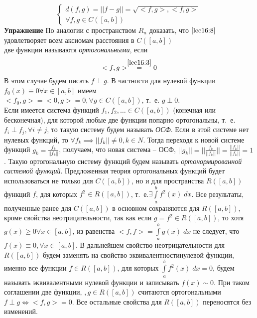 \documentclass[../../main.tex]{subfiles}
\begin{document}
\begin{lemma}
\begin{lemma}
\begin{equation}
\begin{cases}
	 d(f, g) = ||f - g|| = \sqrt{<f, g>, <f, g>}\\
	 \forall f, g \in C(\left[a, b\right])
	 \end{cases}
	 \end{equation}
	\textbf{Упражнение} По аналогии с пространством $R_n$ доказать, что
	 $\eqref{lec16:8}$ удовлетворяет всем аксиомам расстояния в $C(\left[a, 
	 b\right])$\\
	две функции называютя \emph{ортогональными}, если
	\begin{equation} 
	\label{lec16:9}
	<f, g> \stackrel{\eqref{lec16:3}}{=} 0
	\end{equation}
	 В этом случае будем писать $f \perp g$. В частности для нулевой функции 
	 $f_0(x)
	  \equiv 0 \forall x \in \left[a, b\right]$ имеем\\
	 $<f_0, g> = <0, g> = 0, \forall g \in C(\left[a, b\right])$, т.~е. $g\perp 
	 0$.\\
	 Если имеется система функций $f_1, f_2, \ldots \in  C(\left[a, b\right]) $
	  (конечная или бесконечная), для которой любые две функции попарно 
	  ортогональны,
	   т.~е. $f_i \perp f_j, \forall i \neq j$, то такую систему будем называть 
	   \emph{ОСФ}.
	    Если в этой системе нет нулевых функций, то $\forall f_k \implies ||f_k||
	     \neq 0, k \in N $. Тогда переходя к новой системе функций $g_k =
	      \frac{f_k}{||f_k||}$, получаем, что новая система \--- ОСФ, $||g_k|| =
	       ||\frac{f_k}{||f_k||}|| = \frac{||f_k||}{||f_k||} = 1$. Такую 
	       ортогональную
	        систему функций будем называть \emph{ортонормированной системой 
	        функций}.
	 Предложенная теория ортогональных функций будет использоваться не только для
	  $C(\left[a, b\right])$, но и для пространства $R(\left[a, b\right])$ 
	  функций $f$,
	  	   для которых $f^2 \in R(\left[a, b\right])$, т.~е.$\exists 
	  	   \int\limits_a^b
   		f^2(x)\; dx$. Все результаты, полученные ранее для $C(\left[a, b\right])$ 
   		в
	    основном сохраняются для $R(\left[a, b\right])$, кроме свойства
	     неотрицательности, так как  если $g = f^2 \in R(\left[a, b\right])$, то 
	     хотя
	     $g(x) \ge 0 \forall x \in \left[a, b\right]$, из равенства $<f,f> =
	     \int\limits_a^b g(x)\; dx$ не следует, что $f(x) \equiv 0, \forall x \in
      \left[a, b\right]$. В дальнейшем свойство неотрицательности для 
      $R(\left[a,
      b\right])$ будем заменять на свойство эквивалентностинулевой функции,   
      именно
       все функции $f \in R(\left[a, b\right])$, для которых
      $\int\limits_a^b f^2(x)\; dx = 0$, будем называть эквивалентными нулевой
      функции и записывать $f(x) \sim 0$. При таком соглашении две функции, $,
	            g \in R(\left[a, b\right])$ считаются ортогональными $f \perp g
	             \iff <f, g> = 0$. Все остальные свойства для $R(\left[a,
	              b\right])$ переносятся без изменений.

\end{lemma}
\end{lemma}
\end{document}
